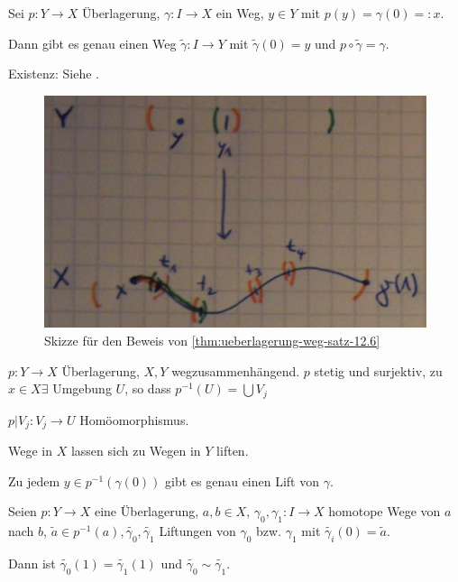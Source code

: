 \begin{satz}\label{thm:ueberlagerung-weg-satz-12.6}
    Sei $p: Y \rightarrow X$ Überlagerung, $\gamma: I \rightarrow X$
    ein Weg, $y \in Y$ mit $p(y) = \gamma(0) =: x$.

    Dann gibt es genau einen Weg $\tilde{\gamma}: I \rightarrow Y$
    mit $\tilde{\gamma}(0)=y$ und $p \circ \tilde{\gamma} = \gamma$.
\end{satz}

\begin{beweis}
Existenz: Siehe .
    \begin{figure}[htp]
        \centering
        \includegraphics[width=0.6\linewidth, keepaspectratio]{figures/todo/skizze-1.jpg}
        \caption{Skizze für den Beweis von \cref{thm:ueberlagerung-weg-satz-12.6}}
        \label{fig:satz-12.6}
    \end{figure}
\end{beweis}

$p:Y \rightarrow X$ Überlagerung, $X,Y$ wegzusammenhängend.
$p$ stetig und surjektiv, zu $x \in X \exists$ Umgebung $U$, so dass
$p^{-1}(U) = \bigcup V_j$

$p|V_j: V_j \rightarrow U$ Homöomorphismus.

\begin{bemerkung}%
    Wege in $X$ lassen sich zu Wegen in $Y$ liften.

    Zu jedem $y \in p^{-1}(\gamma(0))$ gibt es genau einen Lift von 
    $\gamma$.
\end{bemerkung}

\begin{proposition}\label{proposition:12.7}%
    Seien $p: Y \rightarrow X$ eine Überlagerung, $a,b \in X$,
    $\gamma_0, \gamma_1: I \rightarrow X$ homotope Wege von $a$ nach
    $b$, $\tilde{a} \in p^{-1}(a), \tilde{\gamma_0}, \tilde{\gamma_1}$
    Liftungen von $\gamma_0$ bzw. $\gamma_1$ mit 
    $\tilde{\gamma_i}(0) = \tilde{a}$.

    Dann ist $\tilde{\gamma_0}(1) = \tilde{\gamma_1}(1)$ und
    $\tilde{\gamma_0} \sim \tilde{\gamma_1}$.
\end{proposition}


